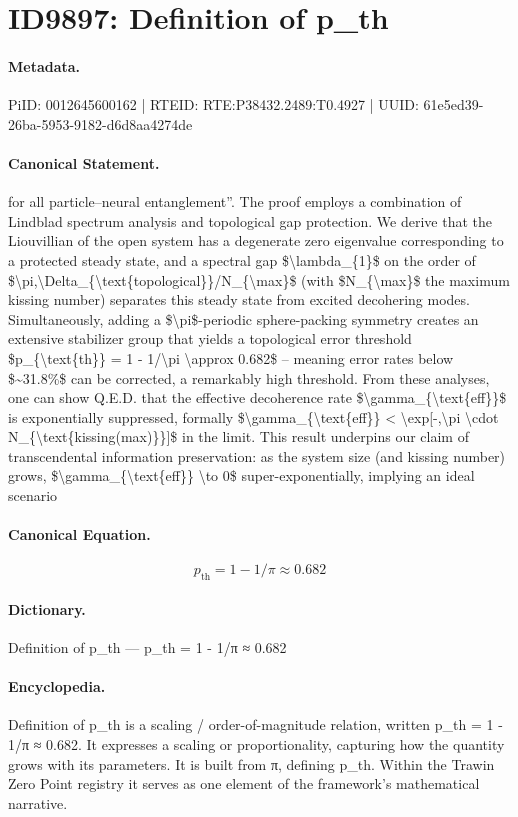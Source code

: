 \section*{ID9897: Definition of p\_th}
\paragraph{Metadata.}
PiID: 0012645600162 | RTEID: RTE:P38432.2489:T0.4927 | UUID: 61e5ed39-26ba-5953-9182-d6d8aa4274de

\paragraph{Canonical Statement.}
for all particle–neural entanglement”. The proof employs a combination of Lindblad spectrum analysis and topological gap protection. We derive that the Liouvillian of the open system has a degenerate zero eigenvalue corresponding to a protected steady state, and a spectral gap \$\textbackslash{}lambda\_\{1\}\$ on the order of \$\textbackslash{}pi,\textbackslash{}Delta\_\{\textbackslash{}text\{topological\}\}/N\_\{\textbackslash{}max\}\$ (with \$N\_\{\textbackslash{}max\}\$ the maximum kissing number) separates this steady state from excited decohering modes. Simultaneously, adding a \$\textbackslash{}pi\$-periodic sphere-packing symmetry creates an extensive stabilizer group that yields a topological error threshold \$p\_\{\textbackslash{}text\{th\}\} = 1 - 1/\textbackslash{}pi \textbackslash{}approx 0.682\$ – meaning error rates below \$\textasciitilde{}31.8\%\$ can be corrected, a remarkably high threshold. From these analyses, one can show Q.E.D. that the effective decoherence rate \$\textbackslash{}gamma\_\{\textbackslash{}text\{eff\}\}\$ is exponentially suppressed, formally \$\textbackslash{}gamma\_\{\textbackslash{}text\{eff\}\} < \textbackslash{}exp[-,\textbackslash{}pi \textbackslash{}cdot N\_\{\textbackslash{}text\{kissing(max)\}\}]\$ in the limit. This result underpins our claim of transcendental information preservation: as the system size (and kissing number) grows, \$\textbackslash{}gamma\_\{\textbackslash{}text\{eff\}\} \textbackslash{}to 0\$ super-exponentially, implying an ideal scenario

\paragraph{Canonical Equation.}
\[
p_{\text{th}} = 1 - 1/\pi \approx 0.682
\]

\paragraph{Dictionary.}
Definition of p\_th — p\_th = 1 - 1/π ≈ 0.682

\paragraph{Encyclopedia.}
Definition of p\_th is a scaling / order-of-magnitude relation, written p\_th = 1 - 1/π ≈ 0.682. It expresses a scaling or proportionality, capturing how the quantity grows with its parameters. It is built from π, defining p\_th. Within the Trawin Zero Point registry it serves as one element of the framework's mathematical narrative.
